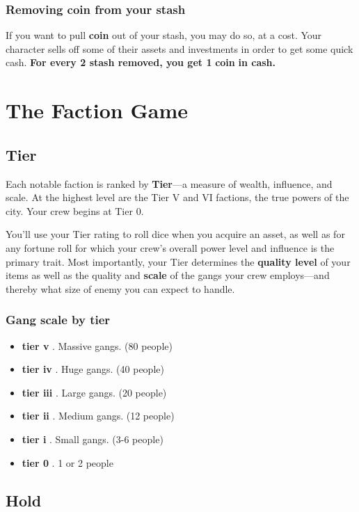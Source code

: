 \documentclass[11pt,oneside]{book}
\newcommand{\gameterm}[1]{\textbf{#1}}
\begin{document}
\subsection{Removing coin from your stash}

If you want to pull \gameterm{coin}  out of your stash, you may do so, at a cost. Your character sells off some of their assets and investments in order to get some quick cash. \textbf{For every 2 stash removed, you get 1 }\gameterm{coin} \textbf{ in cash.}

\chapter{The Faction Game}

\section{Tier}

Each notable faction is ranked by \textbf{Tier}---a measure of wealth, influence, and scale. At the highest level are the Tier V and VI factions, the true powers of the city. Your crew begins at Tier 0.

You’ll use your Tier rating to roll dice when you acquire an asset, as well as for any fortune roll for which your crew’s overall power level and influence is the primary trait. Most importantly, your Tier determines the \textbf{quality level} of your items as well as the quality and \textbf{scale} of the gangs your crew employs---and thereby what size of enemy you can expect to handle.

\subsection{Gang scale by tier}

\begin{itemize}
	\item \gameterm{tier v} . Massive gangs. (80 people)
	\item \gameterm{tier iv} . Huge gangs. (40 people)
	\item \gameterm{tier iii} . Large gangs. (20 people)
	\item \gameterm{tier ii} . Medium gangs. (12 people)
	\item \gameterm{tier i} . Small gangs. (3-6 people)
	\item \gameterm{tier 0} . 1 or 2 people
\end{itemize}

\section{Hold}
\end{document}
